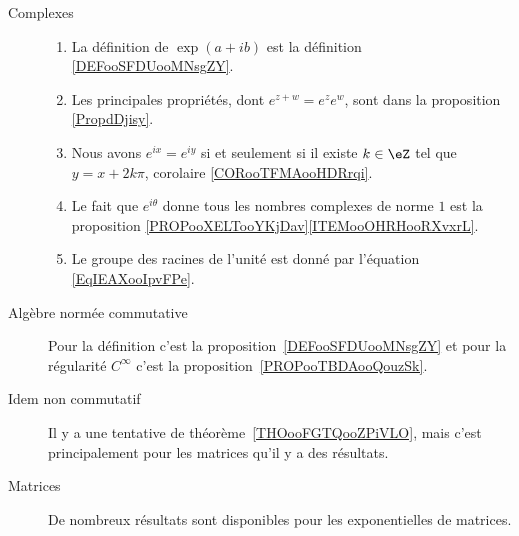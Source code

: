 \begin{description}
	\item[Complexes]

		\begin{enumerate}
			\item
			      La définition de \( \exp(a+ib)\) est la définition \ref{DEFooSFDUooMNsgZY}.
			\item
			      Les principales propriétés, dont \(  e^{z+w}= e^{z} e^{w}\), sont dans la proposition \ref{PropdDjisy}.
			\item
			      Nous avons \(  e^{ix}= e^{iy}\) si et seulement si il existe \( k\in\eZ\) tel que \( y=x+2k\pi\), corolaire \ref{CORooTFMAooHDRrqi}.
			\item
			      Le fait que \(  e^{i\theta}\) donne tous les nombres complexes de norme \( 1\) est la proposition \ref{PROPooXELTooYKjDav}\ref{ITEMooOHRHooRXvxrL}.
			\item
			      Le groupe des racines de l'unité est donné par l'équation \eqref{EqIEAXooIpvFPe}.
		\end{enumerate}

	\item[Algèbre normée commutative]

		Pour la définition c'est la proposition~\ref{DEFooSFDUooMNsgZY} et pour la régularité \(  C^{\infty}\) c'est la proposition~\ref{PROPooTBDAooQouzSk}.

	\item[Idem non commutatif]

		Il y a une tentative de théorème~\ref{THOooFGTQooZPiVLO}, mais c'est principalement pour les matrices qu'il y a des résultats.

	\item[Matrices]

		De nombreux résultats sont disponibles pour les exponentielles de matrices.


\end{description}
